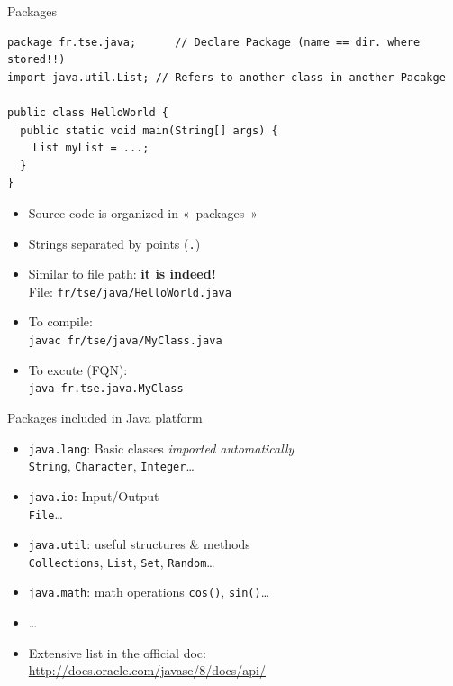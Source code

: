 \documentclass[English,c,%
hyperref={%
    pdftitle={FISA-DE2 OOP in Java},%
    pdfauthor={Muller, Gravier, Laforest, Subercaze},%
    pdfsubject={OOP in Java},%
    pdfkeywords={OOP, Java},%
    colorlinks=true,%
    urlcolor=blue,%
    linkcolor=%
    },%
xcolor={pdftex,svgnames} %
]{beamer}
\begin{document}
\begin{frame}[fragile]{Packages}

\begin{lstlisting}[escapechar=\%,label=hellopackage,caption=HelloWorld.java]
package fr.tse.java;      // Declare Package (name == dir. where stored!!)
import java.util.List; // Refers to another class in another Pacakge

public class HelloWorld {
  public static void main(String[] args) {
    List myList = ...;
  }
}
\end{lstlisting}

{\scriptsize
\begin{itemize}
    \item Source code is organized in «~packages~»
    \item Strings separated by points (\texttt{.})
    \item Similar to file path: \textbf{it is indeed!} \\
    File: \texttt{fr/tse/java/HelloWorld.java}
    \medskip
    \item To compile: \\
    \texttt{javac fr/tse/java/MyClass.java}
    \item To excute (FQN): \\
    \texttt{java fr.tse.java.MyClass}
\end{itemize}
}

\end{frame}

\begin{frame}{Packages included in Java platform}

\begin{itemize}
  \item \texttt{java.lang}: Basic classes \hfill \textit{imported automatically}\\
  \texttt{String}, \texttt{Character}, \texttt{Integer}\ldots{}\\
%
  \medskip
  \item \texttt{java.io}: Input/Output\\
  \texttt{File}\ldots{}
%
  \medskip
  \item \texttt{java.util}: useful structures \& methods\\
  \texttt{Collections}, \texttt{List}, \texttt{Set}, \texttt{Random}\ldots{}
%
  \medskip
  \item \texttt{java.math}: math operations
  \texttt{cos()}, \texttt{sin()}\ldots{}
%
  \medskip
  \item \ldots{}
%
  \bigskip
  \item Extensive list in the official doc:\\
  \url{http://docs.oracle.com/javase/8/docs/api/}
\end{itemize}

\end{frame}
\end{document}
